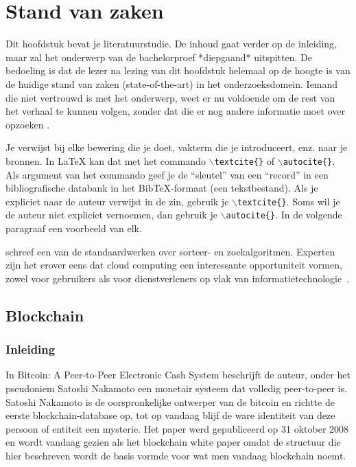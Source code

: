 \chapter{Stand van zaken}
\label{ch:stand-van-zaken}



Dit hoofdstuk bevat je literatuurstudie. De inhoud gaat verder op de inleiding, maar zal het onderwerp van de bachelorproef *diepgaand* uitspitten. De bedoeling is dat de lezer na lezing van dit hoofdstuk helemaal op de hoogte is van de huidige stand van zaken (state-of-the-art) in het onderzoeksdomein. Iemand die niet vertrouwd is met het onderwerp, weet er nu voldoende om de rest van het verhaal te kunnen volgen, zonder dat die er nog andere informatie moet over opzoeken \autocite{Pollefliet2011}.

Je verwijst bij elke bewering die je doet, vakterm die je introduceert, enz. naar je bronnen. In \LaTeX{} kan dat met het commando \texttt{$\backslash${textcite\{\}}} of \texttt{$\backslash${autocite\{\}}}. Als argument van het commando geef je de ``sleutel'' van een ``record'' in een bibliografische databank in het Bib\TeX{}-formaat (een tekstbestand). Als je expliciet naar de auteur verwijst in de zin, gebruik je \texttt{$\backslash${}textcite\{\}}.
Soms wil je de auteur niet expliciet vernoemen, dan gebruik je \texttt{$\backslash${}autocite\{\}}. In de volgende paragraaf een voorbeeld van elk.

\textcite{Knuth1998} schreef een van de standaardwerken over sorteer- en zoekalgoritmen. Experten zijn het erover eens dat cloud computing een interessante opportuniteit vormen, zowel voor gebruikers als voor dienstverleners op vlak van informatietechnologie~\autocite{Creeger2009}.
\newpage
\section{Blockchain}
\label{sec:blockchain}
	\subsection*{Inleiding}
	In Bitcoin: A Peer-to-Peer Electronic Cash System beschrijft de auteur, onder het pseudoniem Satoshi Nakamoto een monetair systeem dat volledig peer-to-peer is. Satoshi Nakamoto is de oorspronkelijke ontwerper van de bitcoin en richtte de eerste blockchain-database op, tot op vandaag blijf de ware identiteit van deze persoon of entiteit een mysterie. Het paper werd gepubliceerd op 31 oktober 2008 en wordt vandaag gezien als het blockchain white paper omdat de structuur die hier beschreven wordt de basis vormde voor wat men vandaag blockchain noemt.

